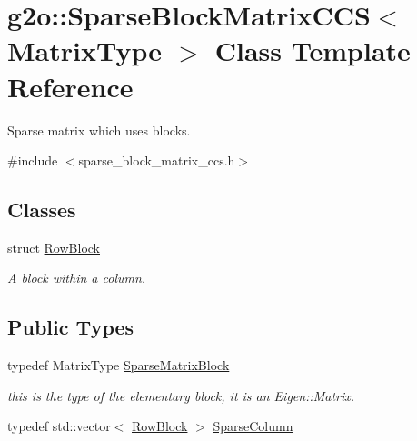 \hypertarget{classg2o_1_1_sparse_block_matrix_c_c_s}{}\section{g2o\+:\+:Sparse\+Block\+Matrix\+C\+CS$<$ Matrix\+Type $>$ Class Template Reference}
\label{classg2o_1_1_sparse_block_matrix_c_c_s}


Sparse matrix which uses blocks.  




{\ttfamily \#include $<$sparse\+\_\+block\+\_\+matrix\+\_\+ccs.\+h$>$}

\subsection*{Classes}
\begin{DoxyCompactItemize}
\item 
struct \mbox{\hyperlink{structg2o_1_1_sparse_block_matrix_c_c_s_1_1_row_block}{Row\+Block}}
\begin{DoxyCompactList}\small\item\em A block within a column. \end{DoxyCompactList}\end{DoxyCompactItemize}
\subsection*{Public Types}
\begin{DoxyCompactItemize}
\item 
typedef Matrix\+Type \mbox{\hyperlink{classg2o_1_1_sparse_block_matrix_c_c_s_a41ea1c8c9d94a25544903ae8345c0354}{Sparse\+Matrix\+Block}}
\begin{DoxyCompactList}\small\item\em this is the type of the elementary block, it is an Eigen\+::\+Matrix. \end{DoxyCompactList}\item 
typedef std\+::vector$<$ \mbox{\hyperlink{structg2o_1_1_sparse_block_matrix_c_c_s_1_1_row_block}{Row\+Block}} $>$ \mbox{\hyperlink{classg2o_1_1_sparse_block_matrix_c_c_s_a4fc5dfe0a9ff9bd62065ca4b17f25bc1}{Sparse\+Column}}
\end{DoxyCompactItemize}
